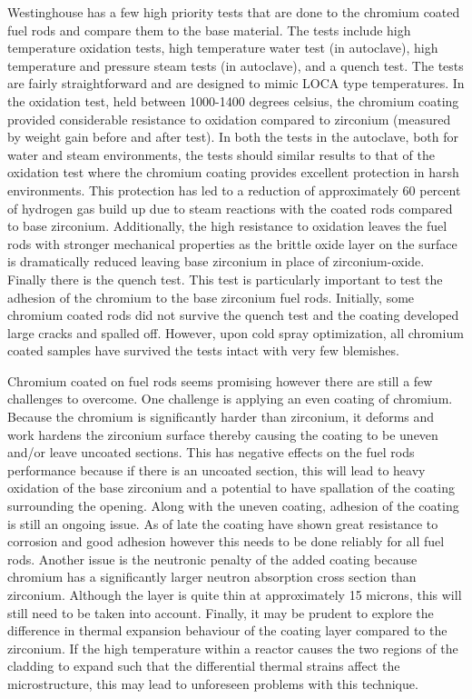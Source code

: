 \documentclass{article}
\begin{document}
Westinghouse has a few high priority tests that are done to the chromium coated fuel rods and compare them to the base material.  The tests include high temperature oxidation tests, high temperature water test (in autoclave), high temperature and pressure steam tests (in autoclave), and a quench test.  The tests are fairly straightforward and are designed to mimic LOCA type temperatures. In the oxidation test, held between 1000-1400 degrees celsius, the chromium coating provided considerable resistance to oxidation compared to zirconium (measured by weight gain before and after test).  In both the tests in the autoclave, both for water and steam environments, the tests should similar results to that of the oxidation test where the chromium coating provides excellent protection in harsh environments. This protection has led to a reduction of approximately 60 percent of hydrogen gas build up due to steam reactions with the coated rods compared to base zirconium.  Additionally, the high resistance to oxidation leaves the fuel rods with stronger mechanical properties as the brittle oxide layer on the surface is dramatically reduced leaving base zirconium in place of zirconium-oxide. Finally there is the quench test.  This test is particularly important to test the adhesion of the chromium to the base zirconium fuel rods.  Initially, some chromium coated rods did not survive the quench test and the coating developed large cracks and spalled off.  However, upon cold spray optimization, all chromium coated samples have survived the tests intact with very few blemishes. 

Chromium coated on fuel rods seems promising however there are still a few challenges to overcome.  One challenge is applying an even coating of chromium.  Because the chromium is significantly harder than zirconium, it deforms and work hardens the zirconium surface thereby causing the coating to be uneven and/or leave uncoated sections.  This has negative effects on the fuel rods performance because if there is an uncoated section, this will lead to heavy oxidation of the base zirconium and a potential to have spallation of the coating surrounding the opening. Along with the uneven coating, adhesion of the coating is still an ongoing issue.  As of late the coating have shown great resistance to corrosion and good adhesion however this needs to be done reliably for all fuel rods.  Another issue is the neutronic penalty of the added coating because chromium has a significantly larger neutron absorption cross section than zirconium.  Although the layer is quite thin at approximately 15 microns, this will still need to be taken into account. Finally, it may be prudent to explore the difference in thermal expansion behaviour of the coating layer compared to the zirconium. If the high temperature within a reactor causes the two regions of the cladding to expand such that the differential thermal strains affect the microstructure, this may lead to unforeseen problems with this technique.
\end{document}
